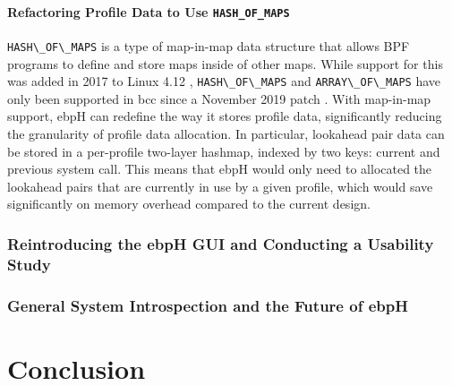 \documentclass[
  12pt]{findlay}
\newcommand{\passthrough}[1]{#1}
\begin{document}
\hypertarget{refactoring-profile-data-to-use-hash_of_maps}{%
\paragraph{\texorpdfstring{Refactoring Profile Data to Use
\texttt{HASH\_OF\_MAPS}}{Refactoring Profile Data to Use HASH\_OF\_MAPS}}\label{refactoring-profile-data-to-use-hash_of_maps}}

\passthrough{\lstinline!HASH\_OF\_MAPS!} \autocite{bcc,gregg19bpf} is a
type of map-in-map data structure that allows BPF programs to define and
store maps inside of other maps. While support for this was added in
2017 to Linux 4.12 \autocite{lau17},
\passthrough{\lstinline!HASH\_OF\_MAPS!} and
\passthrough{\lstinline!ARRAY\_OF\_MAPS!} have only been supported in
bcc \autocite{bcc} since a November 2019 patch \autocite{song19}. With
map-in-map support, ebpH can redefine the way it stores profile data,
significantly reducing the granularity of profile data allocation. In
particular, lookahead pair data can be stored in a per-profile two-layer
hashmap, indexed by two keys: current and previous system call. This
means that ebpH would only need to allocated the lookahead pairs that
are currently in use by a given profile, which would save significantly
on memory overhead compared to the current design.

\hypertarget{reintroducing-the-ebph-gui-and-conducting-a-usability-study}{%
\subsubsection{Reintroducing the ebpH GUI and Conducting a Usability
Study}\label{reintroducing-the-ebph-gui-and-conducting-a-usability-study}}

\label{gui_section}

\hypertarget{general-system-introspection-and-the-future-of-ebph}{%
\subsubsection{General System Introspection and the Future of
ebpH}\label{general-system-introspection-and-the-future-of-ebph}}

\label{general_introspection}

\hypertarget{conclusion}{%
\section{Conclusion}\label{conclusion}}
\end{document}

